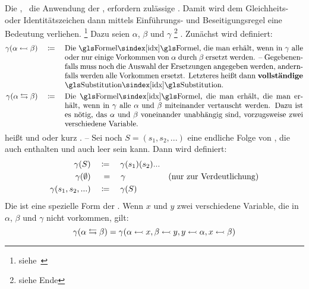 {Die , \textdh\ die Anwendung der , erfordern zulässige .
Damit wird dem Gleichheits- oder Identitätszeichen \chrqt{$\eq$} dann mittels Einführungs- und Beseitigungsregel eine Bedeutung verliehen.%
\footnote{siehe~\cite{bib:NatuerlichesSchliessen}}
Dazu seien $\alpha$, $\beta$ und $\gamma$ %
\footnote{siehe Ende }
\Formeln.
Zunächst wird definiert:
\begin{align}
	\gamma(\alpha \subst \beta) \quad \defeq \quad
	\parbox[t]{11cm}{%
		Die \Formel, die man erhält, wenn in $\gamma$ alle oder nur einige Vorkommen von $\alpha$ durch $\beta$ ersetzt werden.
		-- Gegebenenfalls muss noch die Auswahl der Ersetzungen angegeben werden, andernfalls werden alle Vorkommen ersetzt.
		Letzteres heißt dann \defn{vollständige} \glsIdx{Substitution}.
	} \label{def:Substitution}\\
	\gamma(\alpha \swap \beta) \quad \defeq \quad
	\parbox[t]{11cm}{%
		Die \Formel, die man erhält, die man erhält, wenn in $\gamma$ alle $\alpha$ und $\beta$ miteinander vertauscht werden.
		Dazu ist es nötig, das $\alpha$ und $\beta$ voneinander unabhängig sind, vorzugsweise zwei verschiedene Variable.
	} \label{def:Vertauschung}
\end{align}
\seqqt{$ \alpha \subst \beta $} heißt  und \seqqt{$ \alpha \swap \beta $}  oder kurz .
-- Sei noch $S = (s_1, s_2, ...)$ eine endliche Folge von , die auch  enthalten und auch leer sein kann. Dann wird definiert:
\begin{align}
	\gamma(S) & \quad \coloneqq \quad \gamma(s_1)(s_2)... \label{def:Substitutionen}\\
	\gamma(\emptyset) & \quad \; = \quad \gamma & \text{(nur zur Verdeutlichung)}\\
	\gamma(s_1,s_2,...) & \quad \coloneqq \quad \gamma(S)
\end{align}
%
Die  ist eine spezielle Form der .
Wenn $x$ und $y$ zwei verschiedene Variable, die in $\alpha$, $\beta$ und $\gamma$ nicht vorkommen, gilt:
\[
	\gamma(\alpha \leftrightarrows \beta) = \gamma(\alpha\leftarrowtail x, \beta\leftarrowtail y,  y\leftarrowtail\alpha, x \leftarrowtail\beta)
\]

}
